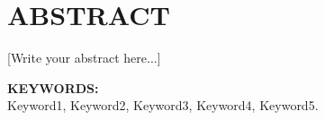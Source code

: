 
\chapter*{ABSTRACT}
\thispagestyle{fancy}


[Write your abstract here...]

\vspace{1cm}

\noindent\textbf{KEYWORDS:}\\
Keyword1, Keyword2, Keyword3, Keyword4, Keyword5.

\newpage
